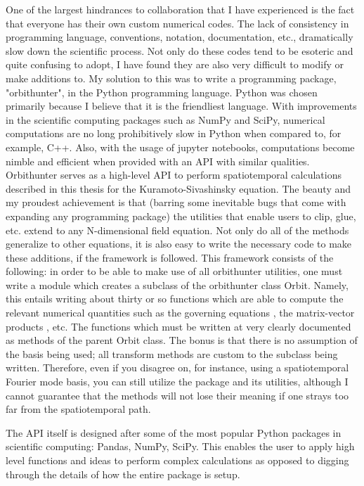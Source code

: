 
One of the largest hindrances to collaboration that I have experienced is the fact that everyone has their
own custom numerical codes. The lack of consistency in programming language, conventions, notation,
documentation, etc., dramatically slow down the scientific process. Not only do these codes
tend to be esoteric and quite confusing to adopt, I have found they are also very difficult to modify or make additions to.
My solution to this was to write a programming package, "orbithunter", in the Python programming language.
Python was chosen primarily because I believe that
it is the friendliest language. With improvements in the scientific computing packages such as NumPy and SciPy,
numerical computations are no long prohibitively slow in Python when compared to, for example, C++. Also,
with the usage of jupyter notebooks, computations become nimble and efficient when provided with an API with
similar qualities. Orbithunter serves as a high-level API to perform spatiotemporal calculations described in this thesis
for the Kuramoto-Sivashinsky equation. The beauty and my proudest achievement is that (barring some inevitable bugs that
come with expanding any programming package) the utilities that enable users to clip, glue, etc. extend to any
N-dimensional field equation. Not only do all of the methods generalize to other equations, it is also easy to
write the necessary code to make these additions, if the framework is followed. This framework consists of the
following: in order to be able to make use of all orbithunter utilities, one must write a module which creates
a subclass of the orbithunter class Orbit. Namely, this entails writing about thirty or so functions which are
able to compute the relevant numerical quantities such as the governing equations %
, the matrix-vector products %
, etc. The functions which must be written at very clearly documented as methods of the parent Orbit class. The
bonus is that there is no assumption of the basis being used; all transform methods are custom to the subclass being written.
Therefore, even if you disagree on, for instance, using a spatiotemporal Fourier mode basis, you can still utilize the package and
its utilities, although I cannot guarantee that the methods will not lose their meaning if one strays too far from the spatiotemporal path.

The API itself is designed after some of the most popular Python packages in scientific computing: Pandas, NumPy, SciPy. This
enables the user to apply high level functions and ideas to perform complex calculations as opposed to digging through the
details of how the entire package is setup.

